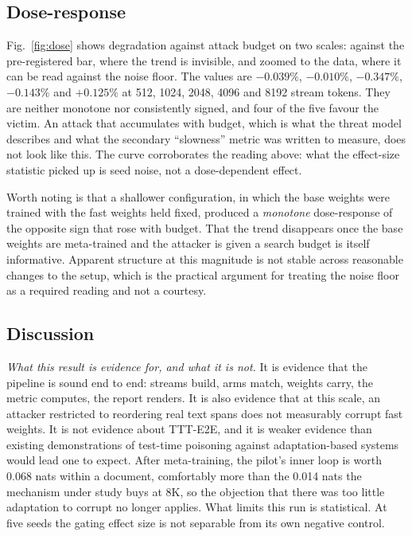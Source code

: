 \documentclass[journal]{IEEEtran}
\begin{document}
\subsection{Dose-response}



Fig.~\ref{fig:dose} shows degradation against attack budget on two scales:
against the pre-registered bar, where the trend is invisible, and zoomed to the
data, where it can be read against the noise floor. The values are $-0.039\%$,
$-0.010\%$, $-0.347\%$, $-0.143\%$ and $+0.125\%$ at 512, 1024, 2048, 4096 and
8192 stream tokens. They are neither monotone nor consistently signed, and four
of the five favour the victim. An attack that accumulates with budget, which is
what the threat model describes and what the secondary ``slowness'' metric was
written to measure, does not look like this. The curve corroborates the reading
above: what the effect-size statistic picked up is seed noise, not a
dose-dependent effect.

Worth noting is that a shallower configuration, in which the base weights were
trained with the fast weights held fixed, produced a \emph{monotone}
dose-response of the opposite sign that rose with budget. That the trend
disappears once the base weights are meta-trained and the attacker is given a
search budget is itself informative. Apparent structure at this magnitude is not
stable across reasonable changes to the setup, which is the practical argument
for treating the noise floor as a required reading and not a courtesy.

\subsection{Discussion}
\label{sec:discussion}

\textit{What this result is evidence for, and what it is not.} It is evidence
that the pipeline is sound end to end: streams build, arms match, weights carry,
the metric computes, the report renders. It is also evidence that at this scale,
an attacker restricted to reordering real text spans does not measurably corrupt
fast weights. It is not evidence about TTT-E2E, and it is weaker evidence than
existing demonstrations of test-time poisoning against adaptation-based
systems~\cite{cong2024ttp,su2025realistic,hoang2024rip} would lead one to expect.
After meta-training, the pilot's inner loop is worth 0.068 nats within a
document, comfortably more than the 0.014 nats the mechanism under study buys at
8K, so the objection that there was too little adaptation to corrupt no longer
applies. What limits this run is statistical. At five seeds the gating effect
size is not separable from its own negative control.
\end{document}
